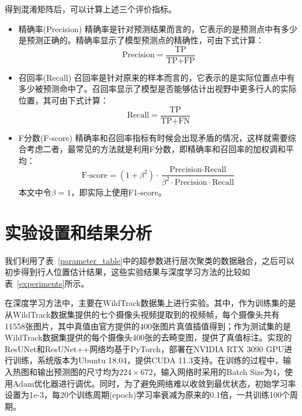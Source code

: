 得到混淆矩阵后，可以计算上述三个评价指标。
\begin{itemize}
    \item 精确率(Precision) 精确率是针对预测结果而言的，它表示的是预测点中有多少是预测正确的。精确率显示了模型预测点的精确性，可由下式计算：
        \begin{equation}
            \text{Precision}=\frac{\text{TP}}{\text{TP}+\text{FP}}
        \end{equation}
    \item 召回率(Recall) 召回率是针对原来的样本而言的，它表示的是实际位置点中有多少被预测命中了。召回率显示了模型是否能够估计出视野中更多行人的实际位置，其可由下式计算：
    \begin{equation}
        \text{Recall}=\frac{\text{TP}}{\text{TP}+\text{FN}}
    \end{equation}
    \item F分数(F-score) 精确率和召回率指标有时候会出现矛盾的情况，这样就需要综合考虑二者，最常见的方法就是利用F分数，即精确率和召回率的加权调和平均：
    \begin{equation}
        \text{F-score}=(1+\beta^2)\cdot \frac{\text{Precision} \cdot \text{Recall}}{\beta^2 \cdot \text{Precision} \cdot \text{Recall}}
    \end{equation}
    本文中令$\beta=1$，即实际上使用F1-score。
\end{itemize}

\section{实验设置和结果分析}

我们利用了表~\ref{parameter_table}中的超参数进行层次聚类的数据融合，之后可以初步得到行人位置估计结果，这些实验结果与深度学习方法的比较如表~\ref{experiments}所示。

在深度学习方法中，主要在WildTrack数据集上进行实验。其中，作为训练集的是从WildTrack数据集提供的七个摄像头视频提取到的视频帧，每个摄像头共有11558张图片，其中真值由官方提供的400张图片真值插值得到；作为测试集的是WildTrack数据集提供的每个摄像头400张的去畸变图，提供了真值标注。实现的ResUNet和ResUNet++网络均基于PyTorch，部署在NVIDIA RTX 3090 GPU进行训练，系统版本为Ubuntu 18.04，提供CUDA 11.3支持。在训练的过程中，输入热图和输出预测图的尺寸均为$224\times 672$，输入网络时采用的Batch Size为4，使用Adam优化器进行调优。同时，为了避免网络难以收敛到最优状态，初始学习率设置为1e-3，每20个训练周期(epoch)学习率衰减为原来的0.1倍，一共训练100个周期。

